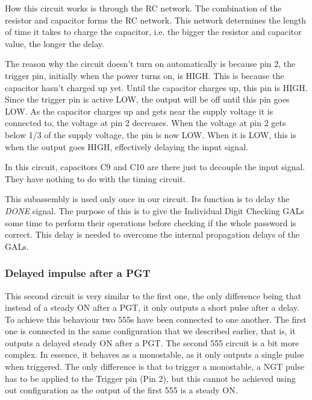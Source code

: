 How this circuit works is through the RC network. The combination of the resistor and capacitor forms the RC network. This network determines the length of time it takes to charge the capacitor, i.e. the bigger the resistor and capacitor value, the longer the delay.\medskip

The reason why the circuit doesn't turn on automatically is because pin 2, the trigger pin, initially when the power turns on, is HIGH. This is because the capacitor hasn't charged up yet. Until the capacitor charges up, this pin is HIGH. Since the trigger pin is active LOW, the output will be off until this pin goes LOW. As the capacitor charges up and gets near the supply voltage it is connected to, the voltage at pin 2 decreases. When the voltage at pin 2 gets below 1/3 of the supply voltage, the pin is now LOW. When it is LOW, this is when the output goes HIGH, effectively delaying the input signal.\medskip

In this circuit, capacitors C9 and C10 are there just to decouple the input signal. They have nothing to do with the timing circuit. \medskip

This subassembly is used only once in our circuit. Its function is to delay the \emph{DONE} signal. The purpose of this is to give the Individual Digit Checking GALs some time to perform their operations before checking if the whole password is correct. This delay is needed to overcome the internal propagation delays of the GALs.\medskip


\subsubsection{Delayed impulse after a PGT}
\label{sec:DELAYED_PULSE}

This second circuit is very similar to the first one, the only difference being that instead of a steady ON after a PGT, it only outputs a short pulse after a delay. To achieve this behaviour two 555s have been connected to one another. The first one is connected in the same configuration that we described earlier, that is, it outputs a delayed steady ON after a PGT. The second 555 circuit is a bit more complex. In essence, it behaves as a monostable, as it only outputs a single pulse when triggered. The only difference is that to trigger a monostable, a NGT pulse has to be applied to the Trigger pin (Pin 2), but this cannot be achieved using out configuration as the output of the first 555 is a steady ON. \medskip

\clearpage

